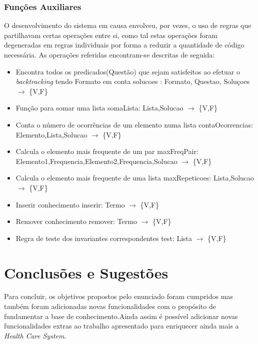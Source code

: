 \documentclass{article}
\begin{document}
\subsubsection{Funções Auxiliares}
O desenvolvimento do sistema em causa envolveu, por vezes, o uso de regras que partilhavam certas operações entre si, como tal estas operações foram degeneradas em regras individuais por forma a reduzir a quantidade de código necessária. As operações referidas encontram-se descritas de seguida:
\begin{itemize}
	\item Encontra todos os predicados(Questão) que sejam satisfeitos ao efetuar o \textit{backtracking} tendo Formato em conta
\newline
solucoes : Formato, Questao, Soluçoes $\to$ \{V,F\}
	\item Função para somar uma lista      
\newline
somaLista: Lista,Solucao $\to$ \{V,F\}
	\item Conta o número de ocorrências de um elemento numa lista
\newline
contaOcorrencias: Elemento,Lista,Solucao $\to$ \{V,F\}
	\item Calcula o elemento mais frequente de um par
\newline
maxFreqPair: Elemento1,Frequencia,Elemento2,Frequencia,Solucao $\to$ \{V,F\}
	\item Calcula o elemento mais frequente de uma lista
\newline
maxRepeticoes: Lista,Solucao $\to$ \{V,F\}
	\item Inserir conhecimento
\newline
inserir: Termo $\to$ \{V,F\}
	\item Remover conhecimento
\newline
remover: Termo $\to$ \{V,F\}
	\item Regra de teste dos invariantes correspondentes
\newline
test: Lista $\to$ \{V,F\}
\end{itemize}

\newpage

\vspace*{\fill}
\section{Conclusões e Sugestões}
Para concluir, os objetivos propostos pelo enunciado foram cumpridos mas também foram adicionadas novas funcionalidades com o propósito de fundamentar a base de conhecimento.Ainda assim é possível adicionar novas funcionalidades extras ao trabalho apresentado para enriquecer ainda mais a \textit{Health Care System}.
\vspace*{\fill}
\end{document}
